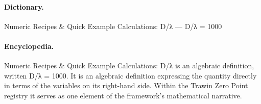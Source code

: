 \paragraph{Dictionary.}
Numeric Recipes \& Quick Example Calculations: D/λ — D/λ = 1000

\paragraph{Encyclopedia.}
Numeric Recipes \& Quick Example Calculations: D/λ is an algebraic definition, written D/λ = 1000. It is an algebraic definition expressing the quantity directly in terms of the variables on its right-hand side. Within the Trawin Zero Point registry it serves as one element of the framework's mathematical narrative.
